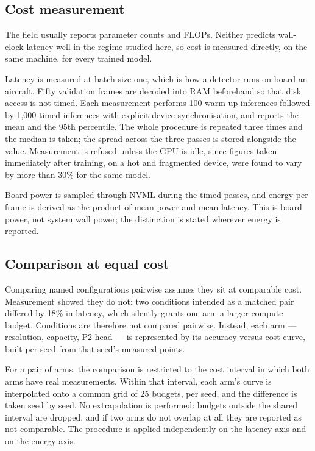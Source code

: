 \subsection{Cost measurement}
\label{sec:setup:cost}

The field usually reports parameter counts and FLOPs. Neither predicts wall-clock latency
well in the regime studied here, so cost is measured directly, on the same machine, for
every trained model.

Latency is measured at batch size one, which is how a detector runs on board an aircraft.
Fifty validation frames are decoded into RAM beforehand so that disk access is not timed.
Each measurement performs 100 warm-up inferences followed by 1{,}000 timed inferences with
explicit device synchronisation, and reports the mean and the 95th percentile. The whole
procedure is repeated three times and the median is taken; the spread across the three
passes is stored alongside the value. Measurement is refused unless the GPU is idle, since
figures taken immediately after training, on a hot and fragmented device, were found to
vary by more than 30\% for the same model.

Board power is sampled through NVML during the timed passes, and energy per frame is
derived as the product of mean power and mean latency. This is board power, not system
wall power; the distinction is stated wherever energy is reported.

\subsection{Comparison at equal cost}
\label{sec:setup:isocost}

Comparing named configurations pairwise assumes they sit at comparable cost. Measurement
showed they do not: two conditions intended as a matched pair differed by 18\% in latency,
which silently grants one arm a larger compute budget. Conditions are therefore not
compared pairwise. Instead, each arm --- resolution, capacity, P2 head --- is represented
by its accuracy-versus-cost curve, built per seed from that seed's measured points.

For a pair of arms, the comparison is restricted to the cost interval in which both arms
have real measurements. Within that interval, each arm's curve is interpolated onto a
common grid of 25 budgets, per seed, and the difference is taken seed by seed. No
extrapolation is performed: budgets outside the shared interval are dropped, and if two
arms do not overlap at all they are reported as not comparable. The procedure is applied
independently on the latency axis and on the energy axis.

